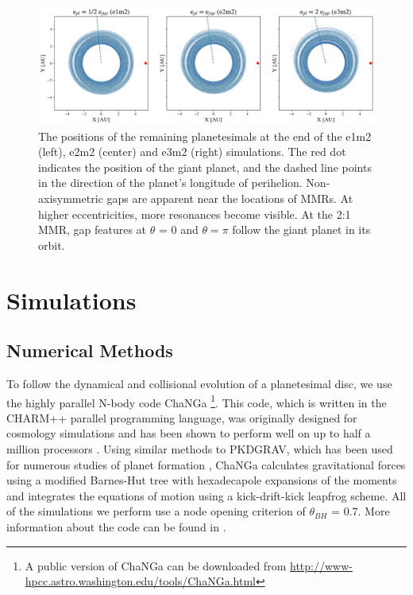 \documentclass[fleqn,usenatbib]{mnras}
\begin{document}
\begin{figure}
\begin{center}
    \includegraphics[width=\textwidth]{figures/xy.png}
    \caption{The positions of the remaining planetesimals at the end of the e1m2 (left), e2m2 (center) and e3m2 (right) simulations. The red dot 
    indicates the position of the giant planet, and the dashed line points in the direction of the planet's longitude of perihelion. Non-axisymmetric gaps 
    are apparent near the locations of MMRs. At higher eccentricities, more resonances become visible. At the 2:1 MMR, gap features at $\theta$ = 0 
    and $\theta = \pi$ follow the giant planet in its orbit.\label{fig:xy}}
\end{center}
\end{figure}

\section{Simulations} \label{sec:sims}

\subsection{Numerical Methods}\label{sec:methods}

To follow the dynamical and collisional evolution of a planetesimal disc, we use the highly parallel N-body code {\sc ChaNGa} 
\footnote{A public version of {\sc ChaNGa} can be downloaded from \url{http://www-hpcc.astro.washington.edu/tools/ChaNGa.html}}. 
This code, which is written in the {\sc CHARM++} parallel programming language, was originally designed for cosmology simulations 
and has been shown to perform well on up to half a million processors \citep{2015AphCom..2..1}. Using similar methods to {\sc PKDGRAV}, which has been used for numerous 
studies of planet formation \citep{2000Icar..143...45R, 2005ApJ...625..427L, 2013ApJ...777L..31D, 2015ApJ...806...23L}, {\sc ChaNGa} calculates 
gravitational forces using a modified Barnes-Hut \citep{1986Natur.324..446B} tree with hexadecapole expansions of the moments and integrates the equations of motion using a 
kick-drift-kick leapfrog scheme. All of the simulations we perform use a node opening criterion of $\theta_{BH}$ = 0.7. More information about the code can be found in 
\citet{2008IEEEpds...ChaNGa}.
\end{document}
